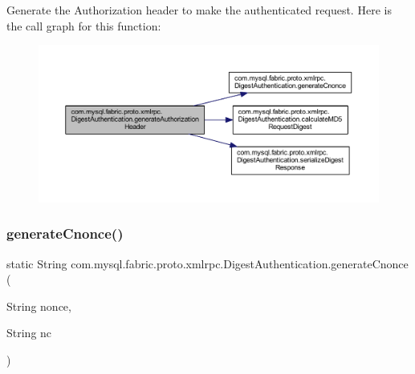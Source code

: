 Generate the Authorization header to make the authenticated request. Here is the call graph for this function\+:\nopagebreak
\begin{figure}[H]
\begin{center}
\leavevmode
\includegraphics[width=350pt]{classcom_1_1mysql_1_1fabric_1_1proto_1_1xmlrpc_1_1_digest_authentication_a7383e84a342b4945b22e8f3cca0b526d_cgraph}
\end{center}
\end{figure}
\mbox{\label{classcom_1_1mysql_1_1fabric_1_1proto_1_1xmlrpc_1_1_digest_authentication_ad06c98ef189413a4f866dacbcdf12137}} 
\subsubsection{\texorpdfstring{generate\+Cnonce()}{generateCnonce()}}
{\footnotesize\ttfamily static String com.\+mysql.\+fabric.\+proto.\+xmlrpc.\+Digest\+Authentication.\+generate\+Cnonce (\begin{DoxyParamCaption}\item[{String}]{nonce,  }\item[{String}]{nc }\end{DoxyParamCaption})\hspace{0.3cm}{\ttfamily [static]}}

